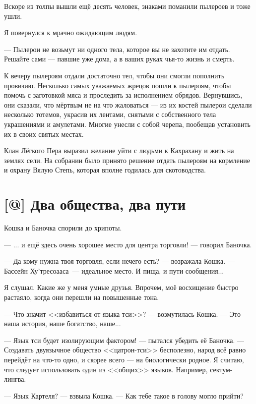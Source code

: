 Вскоре из толпы вышли ещё десять человек, знаками поманили пылероев и тоже ушли.

Я повернулся к мрачно ожидающим людям.

--- Пылерои не возьмут ни одного тела, которое вы не захотите им отдать.
Решайте сами --- павшие уже дома, а в ваших руках чья-то жизнь и смерть.

К вечеру пылероям отдали достаточно тел, чтобы они смогли пополнить провизию.
Несколько самых уважаемых жрецов пошли к пылероям, чтобы помочь с заготовкой мяса и проследить за исполнением обрядов.
Вернувшись, они сказали, что мёртвым не на что жаловаться --- из их костей пылерои сделали несколько тотемов, украсив их лентами, снятыми с собственного тела украшениями и амулетами.
Многие унесли с собой черепа, пообещав установить их в своих святых местах.

Клан Лёгкого Пера выразил желание уйти с людьми к Кахрахану и жить на землях сели.
На собрании было принято решение отдать пылероям на кормление и охрану Вялую Степь, которая вполне годилась для скотоводства.

\section{[@] Два общества, два пути}

\textspace

Кошка и Баночка спорили до хрипоты.

--- ... и ещё здесь очень хорошее место для центра торговли! --- говорил Баночка.

--- Да кому нужна твоя торговля, если нечего есть? --- возражала Кошка.
--- Бассейн Ху'тресоааса\FM\ --- идеальное место.
И пища, и пути сообщения...

Я слушал.
Какие же у меня умные друзья.
Впрочем, моё восхищение быстро растаяло, когда они перешли на повышенные тона.

--- Что значит <<избавиться от языка тси>>? --- возмутилась Кошка.
--- Это наша история, наше богатство, наше...

--- Язык тси будет изолирующим фактором! --- пытался убедить её Баночка.
--- Создавать двуязычное общество <<цатрон-тси>> бесполезно, народ всё равно перейдёт на что-то одно, и скорее всего --- на биологически родное.
Я считаю, что следует использовать один из <<общих>> языков.
Например, сектум-лингва.

--- Язык Картеля? --- взвыла Кошка.
--- Как тебе такое в голову могло прийти?


